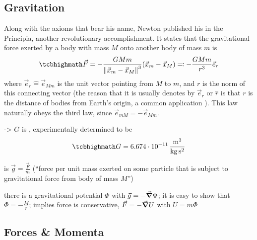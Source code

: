 \documentclass[../class_mech_main.tex]{subfiles}
\begin{document}
		\subsection{Gravitation}
Along with the axioms that bear his name, Newton published his  in the Principia, another revolutionary accomplishment. It states that the gravitational force exerted by a body with mass $M$ onto another body of mass $m$ is
\begin{equation}\label{eq:newton_gravitation_law}
	\eqbox{
		\vec{F} = - \frac{G M m}{\norm{\vec{x}_m - \vec{x}_M}^3} (\vec{x}_m - \vec{x}_M) \eqqcolon - \frac{G M m}{r^3} \vec{e}_r
	}
\end{equation}
where $\vec{e}_r \hat{=} \vec{e}_{Mm}$ is the unit vector pointing from $M$ to $m$, and $r$ is the norm of this connecting vector (the reason that it is usually denotes by $\vec{e}_r$ or $\hat{r}$ is that $r$ is the distance of bodies from Earth's origin, a common application ). This law naturally obeys the third law, since $\vec{e}_{mM} = - \vec{e}_{Mm}$.


-> $G$ is , experimentally determined to be
\begin{equation}
	\eqbox{
		G = 6.674 \cdot 10^{-11} \, \frac{\mathrm{m}^3}{\mathrm{kg} \, \mathrm{s}^2}
	}
\end{equation}


 is $\vec{g} = \frac{\vec{F}}{m}$ (\enquote{force per unit mass exerted on some particle that is subject to gravitational force from body of mass $M$})

there is a gravitational potential $\Phi$ with $\vec{g} = - \grad \Phi$; it is easy to show that $\Phi = - \frac{M}{r}$; implies force is conservative, $\vec{F} = - \grad U$ with $U = m \Phi$



        \subsection{Forces \& Momenta}
		\label{sec:forces_and_momenta}
% 
% 
\end{document}
